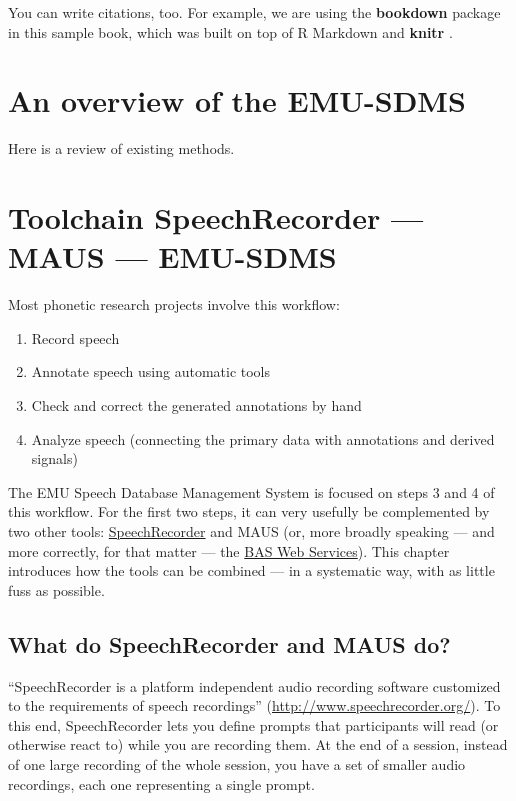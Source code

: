 \documentclass[]{book}
\providecommand{\tightlist}{%
  \setlength{\itemsep}{0pt}\setlength{\parskip}{0pt}}
\theoremstyle{definition}
\theoremstyle{definition}
\theoremstyle{definition}
\theoremstyle{remark}
\begin{document}
You can write citations, too. For example, we are using the
\textbf{bookdown} package \citep{R-bookdown} in this sample book, which
was built on top of R Markdown and \textbf{knitr} \citep{xie2015}.

\chapter{An overview of the EMU-SDMS}\label{an-overview-of-the-emu-sdms}

Here is a review of existing methods.

\chapter{Toolchain SpeechRecorder --- MAUS ---
EMU-SDMS}\label{toolchain-speechrecorder-maus-emu-sdms}

Most phonetic research projects involve this workflow:

\begin{enumerate}
\def\labelenumi{\arabic{enumi}.}
\tightlist
\item
  Record speech
\item
  Annotate speech using automatic tools
\item
  Check and correct the generated annotations by hand
\item
  Analyze speech (connecting the primary data with annotations and
  derived signals)
\end{enumerate}

The EMU Speech Database Management System is focused on steps 3 and 4 of
this workflow. For the first two steps, it can very usefully be
complemented by two other tools:
\href{http://www.speechrecorder.org/}{SpeechRecorder} and MAUS (or, more
broadly speaking --- and more correctly, for that matter --- the
\href{https://clarin.phonetik.uni-muenchen.de/BASWebServices}{BAS Web
Services}). This chapter introduces how the tools can be combined --- in
a systematic way, with as little fuss as possible.

\section{What do SpeechRecorder and MAUS
do?}\label{what-do-speechrecorder-and-maus-do}

``SpeechRecorder is a platform independent audio recording software
customized to the requirements of speech recordings''
(\url{http://www.speechrecorder.org/}). To this end, SpeechRecorder lets
you define prompts that participants will read (or otherwise react to)
while you are recording them. At the end of a session, instead of one
large recording of the whole session, you have a set of smaller audio
recordings, each one representing a single prompt.
\end{document}

